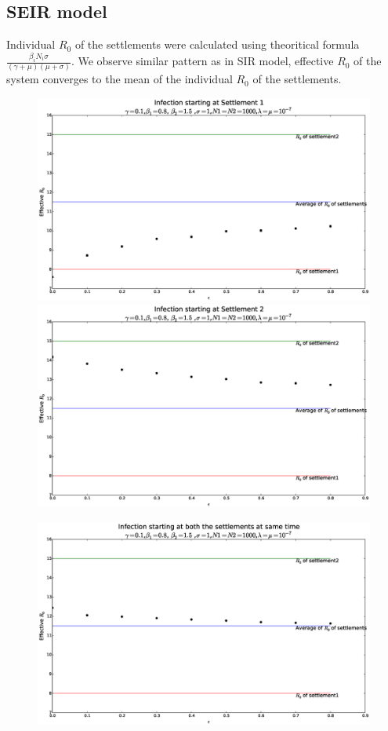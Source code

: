 \documentclass{article}
\begin{document}
\subsection{SEIR model}
Individual $R_{0}$ of the settlements were calculated using
theoritical formula $\frac{\beta_{i} N_{i}
  \sigma}{(\gamma+\mu)(\mu+\sigma)}$. We observe similar pattern as in
SIR model, effective $R_{0}$ of the system converges to the mean of the
individual $R_{0}$ of the settlements.
\begin{figure}[H]
  \hspace*{-2cm}
  \includegraphics[scale=0.4]{Figures_Tables/seir_1inf.eps}
  \hspace*{-2cm} 
  \includegraphics[scale=0.4]{Figures_Tables/seir_2inf.eps}
\end{figure}
\begin{figure}[H]
\hspace*{-2cm}
\includegraphics[scale=0.4]{Figures_Tables/seir_21inf.eps}
\end{figure}
\end{document}
